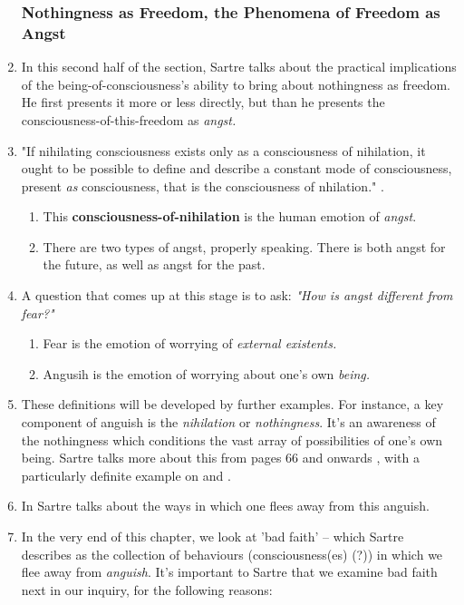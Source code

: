 \begin{enumerate}
  \subsubsection*{Nothingness as Freedom, the Phenomena of Freedom as Angst}
  \item In this second half of the section, Sartre talks about the practical implications of the being-of-consciousness's ability to bring about nothingness as freedom. He first presents it more or less directly, but than he presents the consciousness-of-this-freedom as \emph{angst.}
  \item "If nihilating consciousness exists only as a consciousness of nihilation, it ought to be possible to define and describe a constant mode of consciousness, present \emph{as} consciousness, that is the consciousness of nhilation." \autocite[66]{sartre}.
  \begin{enumerate}
    \item This \textbf{consciousness-of-nihilation} is the human emotion of \emph{angst}.
    \item There are two types of angst, properly speaking. There is both angst for the future, as well as angst for the past.
  \end{enumerate}
  \item A question that comes up at this stage is to ask: \emph{"How is angst different from \emph{fear}?"}
  \begin{enumerate}
    \item Fear is the emotion of worrying of \emph{external existents.}
    \item Angusih is the emotion of worrying about one's own \emph{being.}
  \end{enumerate}
  \item These definitions will be developed by further examples. For instance, a key component of anguish is the \emph{nihilation} or \emph{nothingness}. It's an awareness of the nothingness which conditions the vast array of possibilities of one's own being. Sartre talks more about this from pages 66 and onwards \autocite[66]{sartre}, with a particularly definite example on \autocite[71]{sartre} and \autocite[77]{sartre}.
  \item In \autocite[80]{sartre} Sartre talks about the ways in which one flees away from this anguish.
  \item In the very end of this chapter, we look at 'bad faith' -- which Sartre describes as the collection of behaviours (consciousness(es) (?)) in which we flee away from \emph{anguish}. It's important to Sartre that we examine bad faith next in our inquiry, for the following reasons:

\end{enumerate}
